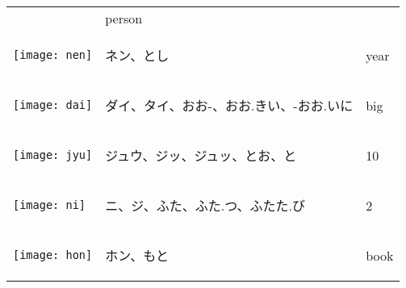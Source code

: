\documentclass[a4paper,12pt]{extarticle}
\begin{document}
\begin{longtable}{|lp{6cm}p{4cm}|}
&
person
\\ 
\begin{minipage}{0.3\textwidth}
\centerline{
	\texttt{[image: nen]}
}
\end{minipage}
&
\begin{CJK}{UTF8}{min}ネン、とし\end{CJK}
&
year
\\ 
\begin{minipage}{0.3\textwidth}
\centerline{
	\texttt{[image: dai]}
}
\end{minipage}
&
\begin{CJK}{UTF8}{min}ダイ、タイ、おお-、おお.きい、-おお.いに\end{CJK}
&
big
\\ 
\begin{minipage}{0.3\textwidth}
\centerline{
	\texttt{[image: jyu]}
}
\end{minipage}
&
\begin{CJK}{UTF8}{min}ジュウ、ジッ、ジュッ、とお、と\end{CJK}
&
10
\\ 
\begin{minipage}{0.3\textwidth}
\centerline{
	\texttt{[image: ni]}
}
\end{minipage}
&
\begin{CJK}{UTF8}{min}ニ、ジ、ふた、ふた.つ、ふたた.び\end{CJK}
&
2
\\ 
\begin{minipage}{0.3\textwidth}
\centerline{
	\texttt{[image: hon]}
}
\end{minipage}
&
\begin{CJK}{UTF8}{min}ホン、もと\end{CJK}
&
book

\end{longtable}
\end{document}
